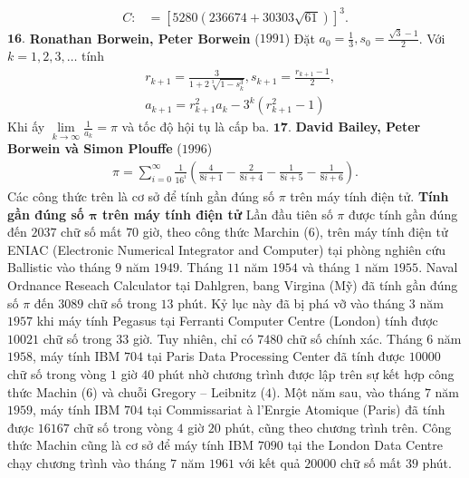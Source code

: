 \begin{multicols}{2}
\begin{align*}
			C\!:\! &\!=\! {\left[ {5280\left( {236674 + 30303\sqrt {61} } \right)} \right]^3}.
	\end{align*}
	$\pmb{16.}$ \textbf{\color{lichsutoanhoc}Ronathan Borwein, Peter Borwein} ($1991$)
	Đặt $a_0 = \frac{1}{3}, s_0 = \frac{\sqrt{3} -1}{2}$.
	\vskip 0.1cm  
	Với $k = 1,2,3, \ldots$ tính 
	\begin{align*}
		&{r_{k + 1}} = \frac{3}{{1 + 2\sqrt[3]{{1 - s_k^3}}}}, {s_{k + 1}} = \frac{{{r_{k + 1}} - 1}}{2},\\
		&{a_{k + 1}} = r_{k + 1}^2{a_k} - {3^k}\left( {r_{k + 1}^2 - 1} \right)
	\end{align*}
	Khi ấy $\mathop {\lim }\limits_{k \to \infty } \frac{1}{{{a_k}}} = \pi $   và tốc độ hội tụ là cấp ba.
	\vskip 0.1cm
	$\pmb{17.}$ \textbf{\color{lichsutoanhoc}David Bailey, Peter Borwein và Simon Plouffe} ($1996$)
	\begin{align*}
		\pi  \!=\!\!\! \sum\limits_{i = 0}^\infty  {\frac{1}{{{{16}^i}}}\!\!\left(\!\! {\frac{4}{{8i \!+\! 1}} \!-\! \frac{2}{{8i \!+\! 4}} \!-\! \frac{1}{{8i \!+\! 5}} \!-\! \frac{1}{{8i \!+\! 6}}} \!\right).}
	\end{align*}
	Các công thức trên là cơ sở để tính gần đúng số $\pi$  trên máy tính điện tử.
	\vskip 0.1cm
	\textbf{\color{lichsutoanhoc}Tính gần đúng số $\pmb{\pi}$  trên máy tính điện tử}
	\vskip 0.1cm
	Lần đầu tiên số $\pi$  được tính gần đúng đến $2037$ chữ số mất $70$ giờ, theo công thức Marchin ($6$), trên máy tính điện tử ENIAC (Electronic Numerical Integrator and Computer) tại phòng nghiên cứu Ballistic vào tháng $9$ năm $1949$.
	Tháng $11$ năm $1954$ và tháng $1$ năm $1955$. Naval Ordnance Reseach Calculator tại Dahlgren, bang Virgina (Mỹ) đã tính gần đúng số  $\pi$ đến $3089$ chữ số trong $13$ phút.
	\vskip 0.1cm
	Kỷ lục này đã bị phá vỡ vào tháng $3$ năm $1957$ khi máy tính Pegasus tại Ferranti Computer Centre (London) tính được $10021$ chữ số trong $33$ giờ. Tuy nhiên, chỉ có $7480$ chữ số chính xác.
	\vskip 0.1cm
	Tháng $6$ năm $1958$, máy tính IBM $704$ tại Paris Data Processing Center đã tính được $10000$ chữ số trong vòng $1$ giờ $40$ phút nhờ chương trình được lập trên sự kết hợp công thức Machin ($6$) và chuỗi Gregory -- Leibnitz ($4$).
	\vskip 0.1cm
	Một năm sau, vào tháng $7$ năm $1959$, máy tính IBM $704$ tại Commissariat à l'Enrgie Atomique (Paris) đã tính được $16167$ chữ số trong vòng $4$ giờ $20$ phút, cũng theo chương trình trên.
	\vskip 0.1cm
	Công thức Machin cũng là cơ sở để máy tính IBM $7090$ tại the London Data Centre chạy chương trình vào tháng $7$ năm $1961$ với kết quả $20000$ chữ số mất $39$ phút.

\end{multicols}
